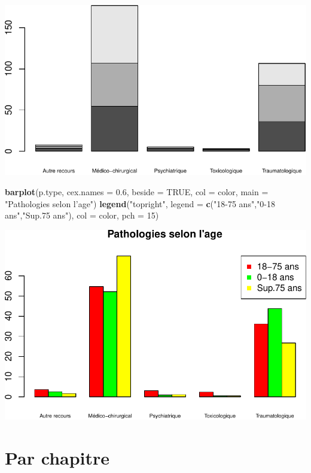 \documentclass[]{article}
\newenvironment{Shaded}{\begin{snugshade}}{\end{snugshade}}
\newcommand{\KeywordTok}[1]{\textcolor[rgb]{0.13,0.29,0.53}{\textbf{{#1}}}}
\newcommand{\DataTypeTok}[1]{\textcolor[rgb]{0.13,0.29,0.53}{{#1}}}
\newcommand{\DecValTok}[1]{\textcolor[rgb]{0.00,0.00,0.81}{{#1}}}
\newcommand{\FloatTok}[1]{\textcolor[rgb]{0.00,0.00,0.81}{{#1}}}
\newcommand{\StringTok}[1]{\textcolor[rgb]{0.31,0.60,0.02}{{#1}}}
\newcommand{\OtherTok}[1]{\textcolor[rgb]{0.56,0.35,0.01}{{#1}}}
\newcommand{\NormalTok}[1]{{#1}}
\begin{document}
\includegraphics{analyse_merge_files/figure-latex/synthese-2.pdf}

\begin{Shaded}
\begin{Highlighting}[]
\KeywordTok{barplot}\NormalTok{(p.type, }\DataTypeTok{cex.names =} \FloatTok{0.6}\NormalTok{, }\DataTypeTok{beside =} \OtherTok{TRUE}\NormalTok{, }\DataTypeTok{col =} \NormalTok{color, }\DataTypeTok{main =} \StringTok{"Pathologies selon l'age"}\NormalTok{)}
\KeywordTok{legend}\NormalTok{(}\StringTok{"topright"}\NormalTok{, }\DataTypeTok{legend =} \KeywordTok{c}\NormalTok{(}\StringTok{"18-75 ans"}\NormalTok{,}\StringTok{"0-18 ans"}\NormalTok{,}\StringTok{"Sup.75 ans"}\NormalTok{), }\DataTypeTok{col =} \NormalTok{color, }\DataTypeTok{pch =} \DecValTok{15}\NormalTok{)}
\end{Highlighting}
\end{Shaded}

\includegraphics{analyse_merge_files/figure-latex/synthese-3.pdf}

\section{Par chapitre}\label{par-chapitre}
\end{document}
